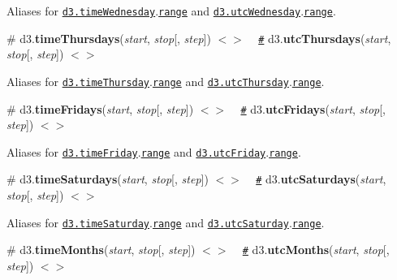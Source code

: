 Aliases for \href{#timeWednesday}{\tt d3.\+time\+Wednesday}.\href{#interval_range}{\tt range} and \href{#timeWednesday}{\tt d3.\+utc\+Wednesday}.\href{#interval_range}{\tt range}.

\label{_timeThursdays}%
\# d3.{\bfseries time\+Thursdays}({\itshape start}, {\itshape stop}\mbox{[}, {\itshape step}\mbox{]}) \href{https://github.com/d3/d3-time/blob/master/src/week.js#L27}{\tt $<$$>$} ~\newline
\href{#timeThursdays}{\tt \#} d3.{\bfseries utc\+Thursdays}({\itshape start}, {\itshape stop}\mbox{[}, {\itshape step}\mbox{]}) \href{https://github.com/d3/d3-time/blob/master/src/utcWeek.js#L27}{\tt $<$$>$}

Aliases for \href{#timeThursday}{\tt d3.\+time\+Thursday}.\href{#interval_range}{\tt range} and \href{#timeThursday}{\tt d3.\+utc\+Thursday}.\href{#interval_range}{\tt range}.

\label{_timeFridays}%
\# d3.{\bfseries time\+Fridays}({\itshape start}, {\itshape stop}\mbox{[}, {\itshape step}\mbox{]}) \href{https://github.com/d3/d3-time/blob/master/src/week.js#L28}{\tt $<$$>$} ~\newline
\href{#timeFridays}{\tt \#} d3.{\bfseries utc\+Fridays}({\itshape start}, {\itshape stop}\mbox{[}, {\itshape step}\mbox{]}) \href{https://github.com/d3/d3-time/blob/master/src/utcWeek.js#L28}{\tt $<$$>$}

Aliases for \href{#timeFriday}{\tt d3.\+time\+Friday}.\href{#interval_range}{\tt range} and \href{#timeFriday}{\tt d3.\+utc\+Friday}.\href{#interval_range}{\tt range}.

\label{_timeSaturdays}%
\# d3.{\bfseries time\+Saturdays}({\itshape start}, {\itshape stop}\mbox{[}, {\itshape step}\mbox{]}) \href{https://github.com/d3/d3-time/blob/master/src/week.js#L29}{\tt $<$$>$} ~\newline
\href{#timeSaturdays}{\tt \#} d3.{\bfseries utc\+Saturdays}({\itshape start}, {\itshape stop}\mbox{[}, {\itshape step}\mbox{]}) \href{https://github.com/d3/d3-time/blob/master/src/utcWeek.js#L29}{\tt $<$$>$}

Aliases for \href{#timeSaturday}{\tt d3.\+time\+Saturday}.\href{#interval_range}{\tt range} and \href{#timeSaturday}{\tt d3.\+utc\+Saturday}.\href{#interval_range}{\tt range}.

\label{_timeMonths}%
\# d3.{\bfseries time\+Months}({\itshape start}, {\itshape stop}\mbox{[}, {\itshape step}\mbox{]}) \href{https://github.com/d3/d3-time/blob/master/src/month.js#L15}{\tt $<$$>$} ~\newline
\href{#timeMonths}{\tt \#} d3.{\bfseries utc\+Months}({\itshape start}, {\itshape stop}\mbox{[}, {\itshape step}\mbox{]}) \href{https://github.com/d3/d3-time/blob/master/src/utcMonth.js#L15}{\tt $<$$>$}

